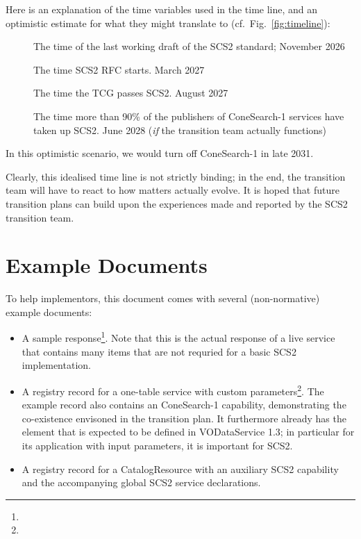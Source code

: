 \documentclass[11pt,a4paper]{ivoa}
\begin{document}
Here is an explanation of the time variables used in the time line, and
an optimistic estimate for what they might translate to
(cf.~Fig.~\ref{fig:timeline}):

\begin{description}
\item [] The time of the last working draft of the SCS2
standard; November 2026

\item[] The time SCS2 RFC starts.  March 2027

\item[] The time the TCG passes SCS2.  August 2027

\item[] The time more than 90\% of the publishers of
ConeSearch-1 services have taken up SCS2.  June 2028 (\textit{if} the
transition team actually functions)

\end{description}

In this optimistic scenario, we would turn off ConeSearch-1 in
late 2031.

Clearly, this idealised time line is not strictly binding; in the end,
the transition team will have to react to how matters actually evolve.
It is hoped that future transition plans can build upon the experiences
made and reported by the SCS2 transition team.

\section{Example Documents}
\label{app:examples}

To help implementors, this document comes with several (non-normative)
example documents:

\begin{itemize}
\item A sample response\footnote{}.
Note that this is the actual response of a live service that contains
many items that are not requried for a basic SCS2 implementation.

\item A registry record for a one-table service with custom
parameters\footnote{}.
The example record also contains an ConeSearch-1 capability,
demonstrating the co-existence envisoned in the transition plan.
It furthermore already has the  element that is expected to
be defined in VODataService 1.3; in particular for its application with
input parameters, it is important for SCS2.

\item A registry record for a CatalogResource with an auxiliary SCS2
capability and the accompanying global SCS2 service
declarations.
\end{itemize}
\end{document}
